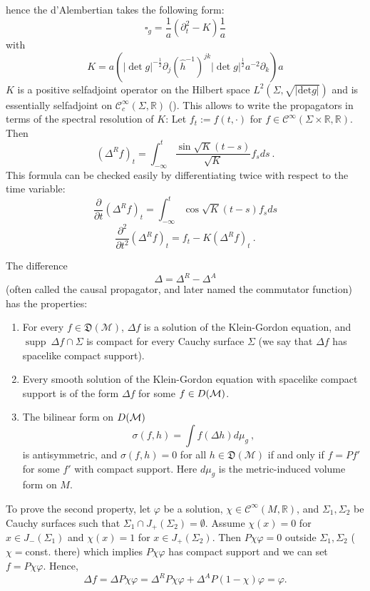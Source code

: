 \documentclass[12pt]{article}
\newcommand{\D}{\mathfrak{D}}
\newcommand{\Mcal}{\mathcal{M}}
\DeclareMathOperator{\supp}{\mathrm{supp}}      %
\newcommand{\RR}{\mathbb{R}}           %
\newcommand{\ph}{\varphi}
\newcommand{\1}{\mathds{1}}                         %
\newcommand{\be}{\begin{equation}}
\newcommand{\ee}{\end{equation}}
\begin{document}
{\begin{exa}
\begin{enumerate}
hence the d'Alembertian takes the following form:
\[\square_g=\frac{1}{a}(\partial_t^2-K)\frac{1}{a}\]
with 
\[K=a\left(|\det{g}|^{-\frac12}\partial_{j}(\hat{h}^{-1})^{jk}|\det{g}|^{\frac12}a^{-2}\partial_{k}\right)a\] 
$K$ is a positive selfadjoint operator on the Hilbert space $L^2(\Sigma,\sqrt{|\mathrm{det}g|})$ and is essentially selfadjoint on $\mathcal{C}^{\infty}_c(\Sigma,\mathbb{R})$
(\cite{Chernoff,Kay78,BrumF14}).
%
{This allows to write the propagators in terms of the spectral resolution of $K$: Let $f_t:=f(t,\cdot)$ for $f\in\mathcal{C}^{\infty}(\Sigma\times\mathbb{R},\mathbb{R})$. Then
\[(\Delta^Rf)_t=\int_{-\infty}^t \frac{\sin\sqrt{K}(t-s)}{\sqrt{K}}f_sds\ .\]}
{This formula can be checked easily by differentiating twice with respect to the time variable:} 
{\[\frac{\partial}{\partial t}(\Delta^Rf)_t=\int_{-\infty}^t \cos{\sqrt{K}(t-s)}f_sds \]}
{\[\frac{\partial^2}{\partial t^2}(\Delta^Rf)_t=f_t-K(\Delta^Rf)_t\ .\]}
\end{enumerate}
\end{exa}
The difference
\[\Delta=\Delta^R-\Delta^A\]
(often called the causal propagator, and later named the commutator function) has the properties:
\begin{enumerate}
\item For every $f\in\D(\Mcal)$, $\Delta f$ is a solution of the Klein-Gordon equation, and $\supp\ \Delta f\cap\Sigma$ is compact for every Cauchy surface $\Sigma$ (we say that $\Delta f$ has {{spacelike compact support}}).
\item Every smooth solution of the Klein-Gordon equation with spacelike compact support is of the form $\Delta f$ for some $f\in \mathcal \D(\Mcal)$.
\item The bilinear form on $\mathcal \D(\Mcal)$
\be\label{bilinear}
\sigma(f,h)=\int f(\Delta h) d\mu_{g}\ ,
\ee
is antisymmetric, and $\sigma(f,h)=0$ for all $h\in\D(\Mcal)$ if and only if $f=Pf'$ for some $f'$ with compact support. Here $d\mu_{g}$ is the metric-induced volume form on $M$.
\end{enumerate}
To prove the second property, let $\ph$ be a solution, $\chi \in \mathcal{C}^\infty(M,\RR)$, and $\Sigma_1, \Sigma_2$ be Cauchy surfaces such that $\Sigma_1 \cap J_+(\Sigma_2)=\emptyset$. Assume $\chi(x)=0$ for $x \in J_-(\Sigma_1)$ and $\chi(x)=1$ for $x \in J_+(\Sigma_2)$. Then $P \chi \ph=0$ outside $\Sigma_1, \Sigma_2$ ($\chi =$const. there) which implies $P\chi \ph$ has compact support and we can set $f=P\chi \ph$. Hence,
\[
 \Delta f= \Delta P \chi \ph =  \Delta^R P \chi \ph +  \Delta^A P(1-\chi)\ph = \ph.
\]

}
\end{document}
